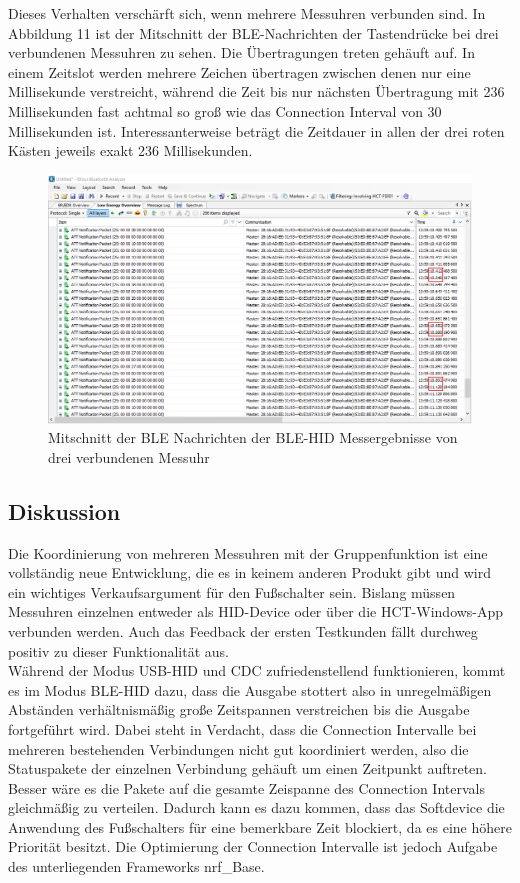 Dieses Verhalten verschärft sich, wenn mehrere Messuhren verbunden sind. In Abbildung 11 ist der Mitschnitt der BLE-Nachrichten der Tastendrücke bei drei verbundenen Messuhren zu sehen. Die Übertragungen treten gehäuft auf. In einem Zeitslot werden mehrere Zeichen übertragen zwischen denen nur eine Millisekunde verstreicht, während die Zeit bis nur nächsten Übertragung mit 236 Millisekunden fast achtmal so groß wie das Connection Interval von 30 Millisekunden ist. Interessanterweise beträgt die Zeitdauer in allen der drei roten Kästen jeweils exakt 236 Millisekunden.
\begin{figure}[H] 
	\centering
	\includegraphics[width=\textwidth]{figures/BLEHID2device.png}
	\caption{Mitschnitt der BLE Nachrichten der BLE-HID Messergebnisse von drei verbundenen Messuhr}
\end{figure}

\subsection{Diskussion}
Die Koordinierung von mehreren Messuhren mit der Gruppenfunktion ist eine vollständig neue Entwicklung, die es in keinem anderen Produkt gibt und wird ein wichtiges Verkaufsargument für den Fußschalter sein. Bislang müssen Messuhren einzelnen entweder als HID-Device oder über die HCT-Windows-App verbunden werden. Auch das Feedback der ersten Testkunden fällt durchweg positiv zu dieser Funktionalität aus.\\
Während der Modus \ac{USB}-\ac{HID} und \ac{CDC} zufriedenstellend funktionieren, kommt es im Modus \ac{BLE}-\ac{HID} dazu, dass die Ausgabe stottert also in unregelmäßigen Abständen verhältnismäßig große Zeitspannen verstreichen bis die Ausgabe fortgeführt wird. Dabei steht in Verdacht, dass die Connection Intervalle bei mehreren bestehenden Verbindungen nicht gut koordiniert werden, also die Statuspakete der einzelnen Verbindung gehäuft um einen Zeitpunkt auftreten. Besser wäre es die Pakete auf die gesamte Zeispanne des Connection Intervals gleichmäßig zu verteilen. Dadurch kann es dazu kommen, dass das Softdevice die Anwendung des Fußschalters für eine bemerkbare Zeit blockiert, da es eine höhere Priorität besitzt. Die Optimierung der Connection Intervalle ist jedoch Aufgabe des unterliegenden Frameworks nrf\_Base.

